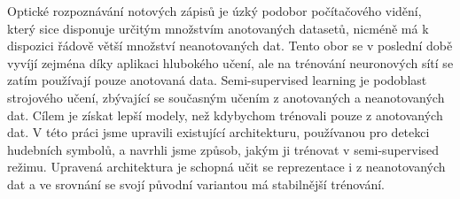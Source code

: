 \documentclass[12pt]{report}
\begin{document}

Optické rozpoznávání notových zápisů je úzký podobor počítačového vidění, který sice disponuje určitým množstvím anotovaných datasetů, nicméně má k dispozici řádově větší množství neanotovaných dat. Tento obor se v poslední době vyvíjí zejména díky aplikaci hlubokého učení, ale na trénování neuronových sítí se zatím používají pouze anotovaná data. Semi-supervised learning je podoblast strojového učení, zbývající se současným učením z anotovaných a neanotovaných dat. Cílem je získat lepší modely, než kdybychom trénovali pouze z anotovaných dat. V této práci jsme upravili existující architekturu, používanou pro detekci hudebních symbolů, a navrhli jsme způsob, jakým ji trénovat v semi-supervised režimu. Upravená architektura je schopná učit se reprezentace i z neanotovaných dat a ve srovnání se svojí původní variantou má stabilnější trénování.
\end{document}
